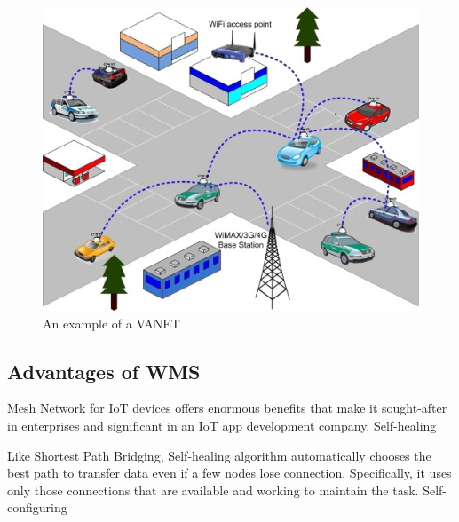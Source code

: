 		\begin{minipage}{0.48\textwidth}\raggedright
			\begin{figure}[H]
				\centering
				\includegraphics[width=\textwidth]{resources/img/chap4/vanet}
				\caption[An example of a VANET]{An example of a VANET \cite{BADIS2015653}}
				\label{img:vanet}
			\end{figure}
		\end{minipage}
	
		
		
	
	
	
	
		\subsection{Advantages of WMS}
		
			Mesh Network for IoT devices offers enormous benefits that make it sought-after in enterprises and significant in an IoT app development company.
			Self-healing
			
			Like Shortest Path Bridging, Self-healing algorithm automatically chooses the best path to transfer data even if a few nodes lose connection. Specifically, it uses only those connections that are available and working to maintain the task.
			Self-configuring
			
